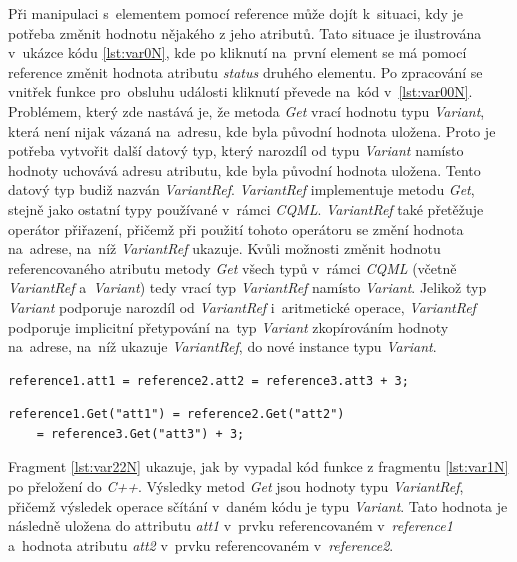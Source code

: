 \documentclass[11pt,twoside,a4paper]{book}
\begin{document}
Při manipulaci s~elementem pomocí reference může dojít k~situaci, kdy je potřeba změnit hodnotu nějakého z jeho atributů. Tato situace je ilustrována v~ukázce kódu \ref{lst:var0N}, kde po kliknutí na~první element se má pomocí reference změnit hodnota atributu \textit{status} druhého elementu. Po zpracování se vnitřek funkce pro~obsluhu události kliknutí převede na~kód v~\ref{lst:var00N}. Problémem, který zde nastává je, že metoda \textit{Get} vrací hodnotu typu \textit{Variant}, která není nijak vázaná na~adresu, kde byla původní hodnota uložena. Proto je potřeba vytvořit další datový typ, který narozdíl od typu \textit{Variant} namísto hodnoty uchovává adresu atributu, kde byla původní hodnota uložena. Tento datový typ budiž nazván \textit{VariantRef}. \textit{VariantRef} implementuje metodu \textit{Get}, stejně jako ostatní typy používané v~rámci \textit{CQML}. \textit{VariantRef} také přetěžuje operátor přiřazení, přičemž při použití tohoto operátoru se změní hodnota na~adrese, na~níž \textit{VariantRef} ukazuje. Kvůli možnosti změnit hodnotu referencovaného atributu metody \textit{Get} všech typů v~rámci \textit{CQML} (včetně \textit{VariantRef} a~\textit{Variant}) tedy vrací typ \textit{VariantRef} namísto \textit{Variant}. Jelikož typ \textit{Variant} podporuje narozdíl od \textit{VariantRef} i~aritmetické operace, \textit{VariantRef} podporuje implicitní přetypování na~typ \textit{Variant} zkopírováním hodnoty na~adrese, na~níž ukazuje \textit{VariantRef}, do nové instance typu \textit{Variant}.\\


\begin{lstlisting}[frame=single,caption=Řádek \textit{CQML} kódu ilustrující přístup k~atributům elementů uložených v~referenci.,label=lst:var1N]
reference1.att1 = reference2.att2 = reference3.att3 + 3;
\end{lstlisting}

\begin{lstlisting}[float,frame=single,caption=Kód ilustrující operace s~typy \textit{Variant} a~\textit{VariantRef}. ,label=lst:var22N]
reference1.Get("att1") = reference2.Get("att2") 
	= reference3.Get("att3") + 3;
\end{lstlisting}
Fragment \ref{lst:var22N} ukazuje, jak by vypadal kód funkce z fragmentu \ref{lst:var1N} po přeložení do \textit{C++}. Výsledky metod \textit{Get} jsou hodnoty typu \textit{VariantRef}, přičemž výsledek operace sčítání v~daném kódu je typu \textit{Variant}. Tato hodnota je následně uložena do attributu \textit{att1} v~prvku referencovaném v~\textit{reference1} a~hodnota atributu \textit{att2} v~prvku referencovaném v~\textit{reference2}.\\
\end{document}

